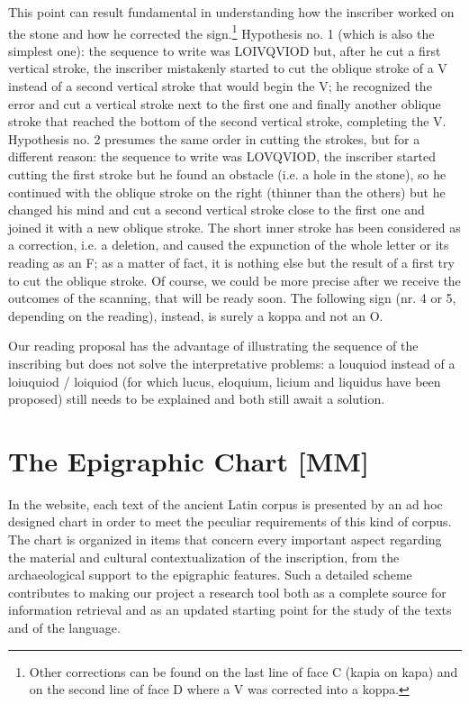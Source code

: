 \documentclass[amsthm,ebook]{saparticle}
\begin{document}
This point can result fundamental in understanding how the inscriber worked on the stone and how he corrected the
sign.\footnote{Other corrections can be found on the last line of face C (kapia on kapa) and on the second line of face
D where a V was corrected into a koppa. } Hypothesis no. 1 (which is also the simplest one): the sequence to write was
LOIVQVIOD but, after he cut a first vertical stroke, the inscriber mistakenly started to cut the oblique stroke of a V
instead of a second vertical stroke that would begin the V; he recognized the error and cut a vertical stroke next to
the first one and finally another oblique stroke that reached the bottom of the second vertical stroke, completing the
V. Hypothesis no. 2 presumes the same order in cutting the strokes, but for a different reason: the sequence to write
was LOVQVIOD, the inscriber started cutting the first stroke but he found an obstacle (i.e. a hole in the stone), so he
continued with the oblique stroke on the right (thinner than the others) but he changed his mind and cut a second
vertical stroke close to the first one and joined it with a new oblique stroke. The short inner stroke has been
considered as a correction, i.e. a deletion, and caused the expunction of the whole letter or its reading as an F; as a
matter of fact, it is nothing else but the result of a first try to cut the oblique stroke. Of course, we could be more
precise after we receive the outcomes of the scanning, that will be ready soon. The following sign (nr. 4 or 5,
depending on the reading), instead, is surely a koppa and not an O.

Our reading proposal has the advantage of illustrating the sequence of the inscribing but does not solve the
interpretative problems: a louquiod instead of a loiuquiod / loiquiod (for which lucus, eloquium, licium and liquidus
have been proposed) still needs to be explained and both still await a solution. 

\section{The Epigraphic Chart [MM]}


In the website, each text of the ancient Latin corpus is presented by an ad hoc designed chart in order to meet the
peculiar requirements of this kind of corpus. The chart is organized in items that concern every important aspect
regarding the material and cultural contextualization of the inscription, from the archaeological support to the
epigraphic features. Such a detailed scheme contributes to making our project a research tool both as a complete source
for information retrieval and as an updated starting point for the study of the texts and of the language.
\end{document}
